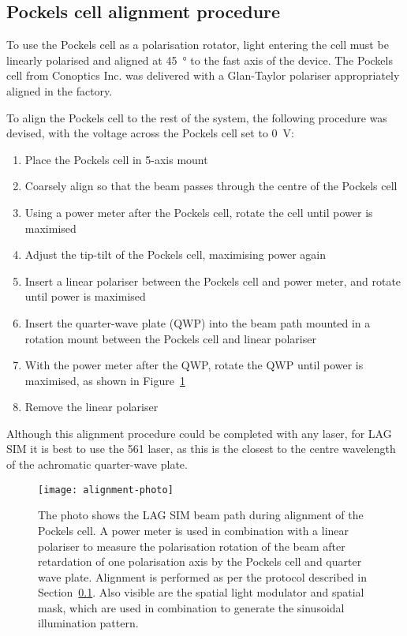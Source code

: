 \subsection{Pockels cell alignment procedure} \label{sec:alignment-procedure}
To use the Pockels cell as a polarisation rotator, light entering the cell must be linearly polarised and aligned at \SI{45}{\degree} to the fast axis of the device. 
The Pockels cell from Conoptics Inc. was delivered with a Glan-Taylor polariser appropriately aligned in the factory. 

To align the Pockels cell to the rest of the system, the following procedure was devised, with the voltage across the Pockels cell set to \SI{0}{\volt}: %
\begin{enumerate}
	\item Place the Pockels cell in 5-axis mount
	\item Coarsely align so that the beam passes through the centre of the Pockels cell
	\item Using a power meter after the Pockels cell, rotate the cell until power is maximised
	\item Adjust the tip-tilt of the Pockels cell, maximising power again
	\item Insert a linear polariser between the Pockels cell and power meter, and rotate until power is maximised
	\item Insert the quarter-wave plate (QWP) into the beam path mounted in a rotation mount between the Pockels cell and linear polariser
	\item With the power meter after the QWP, rotate the QWP until power is maximised, as shown in Figure~\ref{fig:alignment-photo}
	\item Remove the linear polariser
\end{enumerate}

Although this alignment procedure could be completed with any laser, for LAG SIM it is best to use the 561 laser, as this is the closest to the centre wavelength of the achromatic quarter-wave plate. 

\begin{figure}[htbp!]
\centering
\texttt{[image: alignment-photo]}
\caption[LAG SIM: Alignment with the 561\,nm laser]{The photo shows the LAG SIM beam path during alignment of the Pockels cell. A power meter is used in combination with a linear polariser to measure the polarisation rotation of the beam after retardation of one polarisation axis by the Pockels cell and quarter wave plate. Alignment is performed as per the protocol described in Section~\ref{sec:alignment-procedure}. Also visible are the spatial light modulator and spatial mask, which are used in combination to generate the sinusoidal illumination pattern.}
\label{fig:alignment-photo}
\end{figure}


